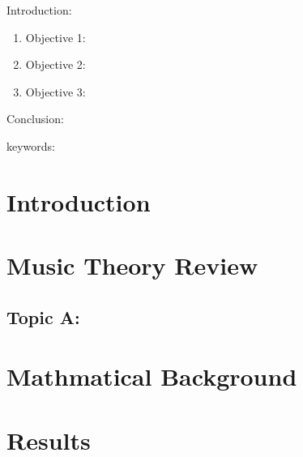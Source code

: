 

\twocolumn
\scriptsize
\begin{frontmatter}
		\title{}
		\author{}
		\address{The Mathematical Learning Space}
\end{frontmatter}	

Introduction:
\begin{enumerate}
\item Objective 1:
\item Objective 2:
\item Objective 3:
\end{enumerate}
Conclusion:

keywords:


\section{Introduction}


\section{Music Theory Review}

\subsection{Topic A:}

\section{Mathmatical Background}

\section{Results}




\begin{thebibliography}{00}

\end{thebibliography}


